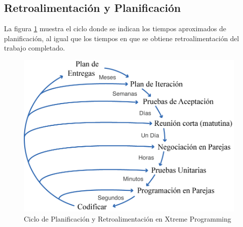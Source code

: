 \subsection{Retroalimentación y Planificación}

La figura \ref{fig:xp_loop} muestra el ciclo donde se indican los tiempos aproximados de planificación, al igual que los tiempos en que se obtiene retroalimentación del trabajo completado.
\begin{figure}[ht]
	 \centering
	 \includegraphics{imagenes/XP-feedback.png}
	 \caption{Ciclo de Planificación y Retroalimentación en Xtreme Programming}
	 \label{fig:xp_loop}
\end{figure}